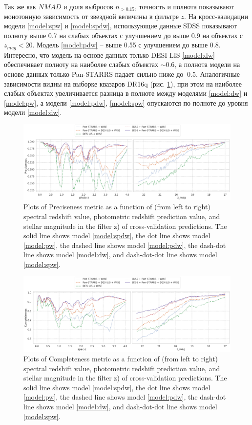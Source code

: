 \documentclass[fleqn,usenatbib]{mnras}
\begin{document}
Так же как $NMAD$ и доля выбросов $n_{>0.15}$, точность и полнота показывают монотонную зависимость от звездной величины в фильтре $z$. На кросс-валидации модели \ref{model:spw} и \ref{model:spdw}, использующие данные SDSS показывают полноту выше 0.7 на слабых объектах с улучшением до выше 0.9 на объектах с $z_{mag} < 20$. Модель \ref{model:pdw} -- выше 0.55 с улучшением до выше 0.8. Интересно, что модель на основе данных только DESI LIS \ref{model:dw} обеспечивает полноту на наиболее слабых объектах $\sim 0.6$, а полнота модели на основе данных только Pan-STARRS падает сильно ниже до $~0.5$. Аналогичные зависимости видны на выборке квазаров DR16q (рис. \ref{fig:metrics-prec-cv2-total}), при этом на наиболее слабых объектах увеличивается разница в полноте между моделями \ref{model:dw} и \ref{model:pw}, а модели \ref{model:pdw}, \ref{model:spw} опускаются по полноте до уровня модели \ref{model:dw}.

\begin{figure}
    \centering
    \includegraphics[width=0.9\linewidth]{images/metrics-prec-cv2.png}
    \caption{Plots of Preciseness metric as a function of (from left to right) spectral redshift value, photometric redshift prediction value, and stellar magnitude in the filter z) of cross-validation predictions. The solid line shows model \ref{model:spdw}, the dot line shows model \ref{model:pw}, the dashed line shows model \ref{model:pdw}, the dash-dot line shows model \ref{model:dw}, and dash-dot-dot line shows model \ref{model:spw}.}
    \label{fig:metrics-prec-cv2-total}
\end{figure}

\begin{figure}
    \centering
    \includegraphics[width=0.9\linewidth]{images/metrics-comp-cv2.png}
    \caption{Plots of Completeness metric as a function of (from left to right) spectral redshift value, photometric redshift prediction value, and stellar magnitude in the filter z) of cross-validation predictions. The solid line shows model \ref{model:spdw}, the dot line shows model \ref{model:pw}, the dashed line shows model \ref{model:pdw}, the dash-dot line shows model \ref{model:dw}, and dash-dot-dot line shows model \ref{model:spw}.}
    \label{fig:metrics-comp-cv2-total}
\end{figure}
\end{document}
